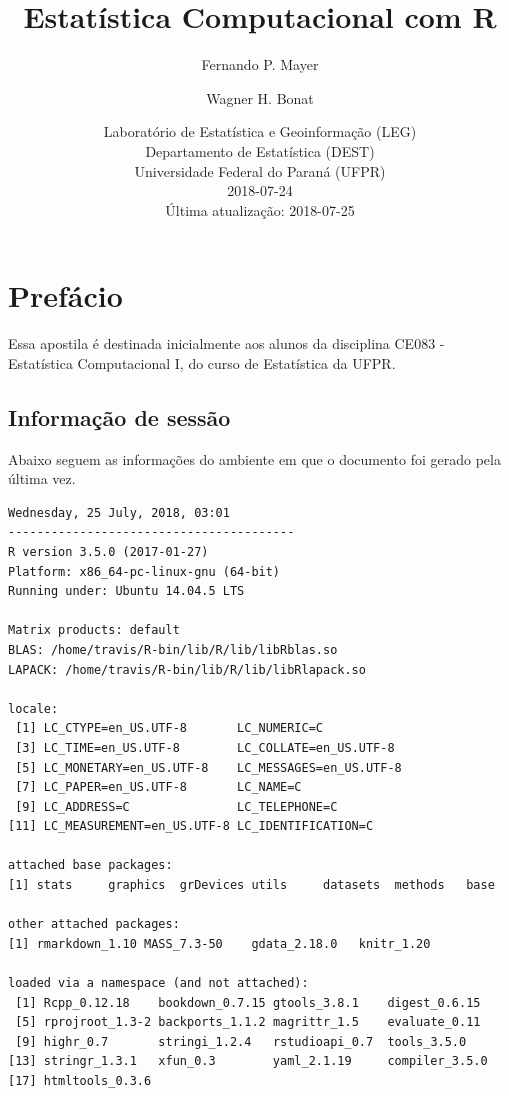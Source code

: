 \documentclass[10pt,a4paper]{book}
\title{Estatística Computacional com R}
\author{Fernando P. Mayer \and Wagner H. Bonat}
\date{Laboratório de Estatística e Geoinformação (LEG)\\
Departamento de Estatística (DEST)\\
Universidade Federal do Paraná (UFPR)\\[2\baselineskip]2018-07-24\\
Última atualização: 2018-07-25}
\begin{document}
\maketitle

{
\hypersetup{linkcolor=black}
\setcounter{tocdepth}{2}
\tableofcontents
}
\chapter*{Prefácio}\label{prefacio}


Essa apostila é destinada inicialmente aos alunos da disciplina CE083 -
Estatística Computacional I, do curso de Estatística da UFPR.

\section*{Informação de sessão}\label{informacao-de-sessao}


Abaixo seguem as informações do ambiente em que o documento foi gerado
pela última vez.

\begin{verbatim}
Wednesday, 25 July, 2018, 03:01
----------------------------------------
R version 3.5.0 (2017-01-27)
Platform: x86_64-pc-linux-gnu (64-bit)
Running under: Ubuntu 14.04.5 LTS

Matrix products: default
BLAS: /home/travis/R-bin/lib/R/lib/libRblas.so
LAPACK: /home/travis/R-bin/lib/R/lib/libRlapack.so

locale:
 [1] LC_CTYPE=en_US.UTF-8       LC_NUMERIC=C              
 [3] LC_TIME=en_US.UTF-8        LC_COLLATE=en_US.UTF-8    
 [5] LC_MONETARY=en_US.UTF-8    LC_MESSAGES=en_US.UTF-8   
 [7] LC_PAPER=en_US.UTF-8       LC_NAME=C                 
 [9] LC_ADDRESS=C               LC_TELEPHONE=C            
[11] LC_MEASUREMENT=en_US.UTF-8 LC_IDENTIFICATION=C       

attached base packages:
[1] stats     graphics  grDevices utils     datasets  methods   base     

other attached packages:
[1] rmarkdown_1.10 MASS_7.3-50    gdata_2.18.0   knitr_1.20    

loaded via a namespace (and not attached):
 [1] Rcpp_0.12.18    bookdown_0.7.15 gtools_3.8.1    digest_0.6.15  
 [5] rprojroot_1.3-2 backports_1.1.2 magrittr_1.5    evaluate_0.11  
 [9] highr_0.7       stringi_1.2.4   rstudioapi_0.7  tools_3.5.0    
[13] stringr_1.3.1   xfun_0.3        yaml_2.1.19     compiler_3.5.0 
[17] htmltools_0.3.6
\end{verbatim}
\end{document}
